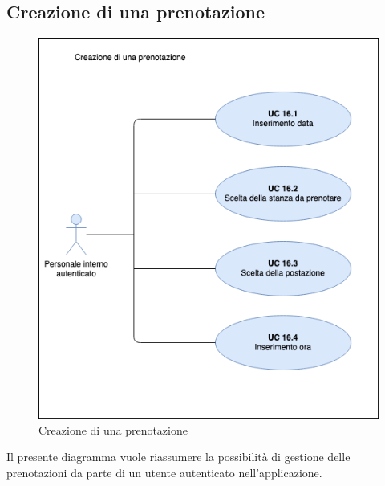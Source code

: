 \subsection{Creazione di una prenotazione}

\begin{figure}[H]
  \centering
    \includegraphics[scale=0.80]{src/CasiDUso/immagini/UC-creazionePrenotazione.png}
  \caption{Creazione di una prenotazione}
\end{figure}

Il presente diagramma vuole riassumere la possibilità di gestione delle prenotazioni da parte di un utente autenticato nell’applicazione.

